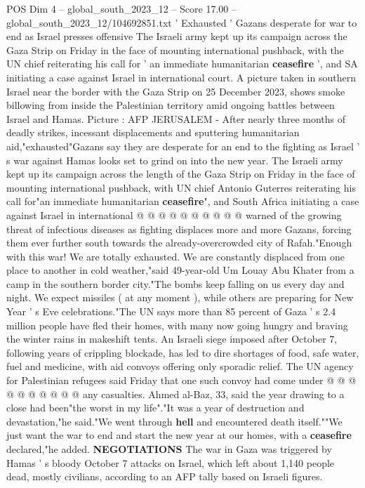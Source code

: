 \begin{textsample}{POS Dim 4 – global\_south\_2023\_12 – Score 17.00 – global\_south\_2023\_12/104692851.txt}  \label{ex:f4_pos_139}
' Exhausted ' Gazans desperate for war to end as Israel presses offensive The Israeli army kept up its campaign across the Gaza Strip on Friday in the face of mounting international pushback, with the UN chief reiterating his call for ' an immediate humanitarian \textbf{ceasefire} ', and SA initiating a case against Israel in international court.
A picture taken in southern Israel near the border with the Gaza Strip on 25 December 2023, shows smoke billowing from inside the Palestinian territory amid ongoing battles between Israel and Hamas.
Picture : AFP JERUSALEM - After nearly three months of deadly strikes, incessant displacements and sputtering humanitarian aid,"exhausted"Gazans say they are desperate for an end to the fighting as Israel ' s war against Hamas looks set to grind on into the new year.
The Israeli army kept up its campaign across the length of the Gaza Strip on Friday in the face of mounting international pushback, with UN chief Antonio Guterres reiterating his call for"an immediate humanitarian \textbf{ceasefire}", and South Africa initiating a case against Israel in international @ @ @ @ @ @ @ @ @ @ warned of the growing threat of infectious diseases as fighting displaces more and more Gazans, forcing them ever further south towards the already-overcrowded city of Rafah."Enough with this war!
We are totally exhausted.
We are constantly displaced from one place to another in cold weather,"said 49-year-old Um Louay Abu Khater from a camp in the southern border city."The bombs keep falling on us every day and night.
We expect missiles ( at any moment ), while others are preparing for New Year ' s Eve celebrations."The UN says more than 85 percent of Gaza ' s 2.4 million people have fled their homes, with many now going hungry and braving the winter rains in makeshift tents.
An Israeli siege imposed after October 7, following years of crippling blockade, has led to dire shortages of food, safe water, fuel and medicine, with aid convoys offering only sporadic relief.
The UN agency for Palestinian refugees said Friday that one such convoy had come under @ @ @ @ @ @ @ @ @ @ any casualties.
Ahmed al-Baz, 33, said the year drawing to a close had been"the worst in my life"."It was a year of destruction and devastation,"he said."We went through \textbf{hell} and encountered death itself.""We just want the war to end and start the new year at our homes, with a \textbf{ceasefire} declared,"he added. \textbf{NEGOTIATIONS} The war in Gaza was triggered by Hamas ' s bloody October 7 attacks on Israel, which left about 1,140 people dead, mostly civilians, according to an AFP tally based on Israeli figures.

\end{textsample}
